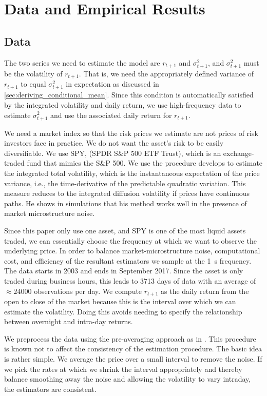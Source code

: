 \documentclass[11pt, letterpaper, twoside]{article}
\begin{document}
\section{Data and Empirical Results}\label{sec:empirics}

\subsection{Data}

The two series we need to estimate the model are $r_{t+1}$ and $\sigma^2_{t+1}$, and $\sigma^2_{t+1}$ must be the volatility of $r_{t+1}$. That is, we need the appropriately defined variance of $r_{t+1}$ to equal $\sigma^2_{t+1}$ in expectation as discussed in \cref{sec:deriving_conditional_mean}. Since this condition is automatically satisfied by the integrated volatility and daily return, we use high-frequency data to estimate $\sigma^2_{t+1}$ and use the associated daily return for $r_{t+1}$. 

We need a market index so that the risk prices we estimate are not prices of risk investors face in practice. We do not want the asset's risk to be easily diversifiable. We use SPY, (SPDR S\&P 500 ETF Trust), which is an exchange-traded fund that mimics the S\&P 500.  We use the procedure \textcite{sangrey2018jumps} develops to estimate the integrated total volatility, which is the instantaneous expectation of the price variance, i.e., the time-derivative of the predictable quadratic variation. This measure reduces to the integrated diffusion volatility if prices have continuous paths. He shows in simulations that his method works well in the presence of market microstructure noise.

Since this paper only use one asset, and SPY is one of the most liquid assets traded, we can essentially choose the frequency at which we want to observe the underlying price. In order to balance market-microstructure noise, computational cost, and efficiency of the resultant estimators we sample at the \SI{1}{\second} frequency. The data starts in 2003 and ends in September 2017. Since the asset is only traded during business hours, this leads to \num{3713} days of data with an average of $\approx \num{24000}$ observations per day. We compute $r_{t+1}$ as the daily return from the open to close of the market because this is the interval over which we can estimate the volatility. Doing this avoids needing  to specify the relationship between overnight and intra-day returns. 

We preprocess the data using the pre-averaging approach as in \textcites{podolskij2009bipower, aitsahalia2012testing}. This procedure is known not to affect the consistency of the estimation procedure. The basic idea is rather simple. We average the price over a small interval to remove the noise. If we pick the rates at which we shrink the interval appropriately and thereby balance smoothing away the noise and allowing the volatility to vary intraday, the estimators are consistent.
\end{document}
